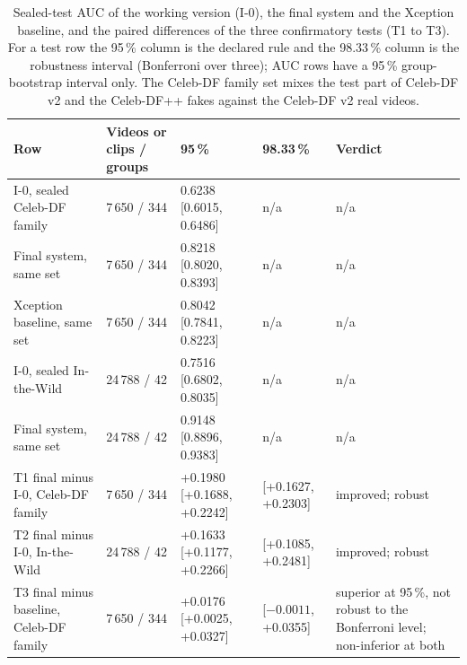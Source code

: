 \documentclass[conference,a4paper]{IEEEtran_nodash}
\begin{document}
\begin{table}[!t]
\centering
\caption[Sealed-test AUC and the three confirmatory tests]{Sealed-test AUC of the working version (I-0), the final system and the
Xception baseline, and the paired differences of the three confirmatory tests
(T1 to T3). For a test row the 95\,\% column is the declared rule and the
98.33\,\% column is the robustness interval (Bonferroni over three); AUC rows
have a 95\,\% group-bootstrap interval only. The Celeb-DF family set mixes the
test part of Celeb-DF v2 and the Celeb-DF++ fakes against the Celeb-DF v2 real
videos.}
\label{tab:final}
\small
\begin{tabular}{@{}L{4.1cm} L{2.2cm} L{3.7cm} L{2.6cm} L{3.4cm}@{}}
\toprule
Row & Videos or clips / groups & 95\,\% & 98.33\,\% & Verdict \\
\midrule
I-0, sealed Celeb-DF family & 7\,650 / 344 & 0.6238 [0.6015, 0.6486] & n/a & n/a %
\\
Final system, same set & 7\,650 / 344 & 0.8218 [0.8020, 0.8393] & n/a & n/a %
\\
Xception baseline, same set & 7\,650 / 344 & 0.8042 [0.7841, 0.8223] & n/a & n/a %
\\
I-0, sealed In-the-Wild & 24\,788 / 42 & 0.7516 [0.6802, 0.8035] & n/a & n/a %
\\
Final system, same set & 24\,788 / 42 & 0.9148 [0.8896, 0.9383] & n/a & n/a %
\\
\midrule
T1 final minus I-0, Celeb-DF family & 7\,650 / 344 & +0.1980 [+0.1688, +0.2242] & [+0.1627, +0.2303] & improved; robust %
\\
T2 final minus I-0, In-the-Wild & 24\,788 / 42 & +0.1633 [+0.1177, +0.2266] & [+0.1085, +0.2481] & improved; robust %
\\
T3 final minus baseline, Celeb-DF family & 7\,650 / 344 & +0.0176 [+0.0025, +0.0327] & [$-0.0011$, +0.0355] & superior at 95\,\%, not robust to the Bonferroni level; non-inferior at both %
\\
\bottomrule
\end{tabular}
\end{table}
\end{document}
